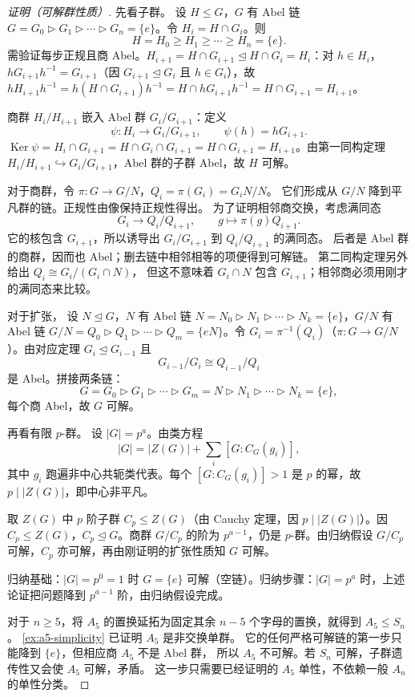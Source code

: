\par\medskip
\begin{proof}[证明（可解群性质）]
先看子群。 设 $H\le G$，$G$ 有 Abel 链 $G=G_0\rhd G_1\rhd\cdots\rhd G_n=\{e\}$。令 $H_i=H\cap G_i$。则
\[
H=H_0\ge H_1\ge\cdots\ge H_n=\{e\}.
\]
需验证每步正规且商 Abel。$H_{i+1}=H\cap G_{i+1}\mathrel{\trianglelefteq} H\cap G_i=H_i$：对 $h\in H_i$，$hG_{i+1}h^{-1}=G_{i+1}$（因 $G_{i+1}\mathrel{\trianglelefteq} G_i$ 且 $h\in G_i$），故 $hH_{i+1}h^{-1}=h(H\cap G_{i+1})h^{-1}=H\cap hG_{i+1}h^{-1}=H\cap G_{i+1}=H_{i+1}$。

商群 $H_i/H_{i+1}$ 嵌入 Abel 群 $G_i/G_{i+1}$：定义
\[
\psi:H_i\to G_i/G_{i+1},\qquad\psi(h)=hG_{i+1}.
\]
$\operatorname{Ker}\psi=H_i\cap G_{i+1}=H\cap G_i\cap G_{i+1}=H\cap G_{i+1}=H_{i+1}$。由第一同构定理 $H_i/H_{i+1}\hookrightarrow G_i/G_{i+1}$，Abel 群的子群 Abel，故 $H$ 可解。

对于商群，令 $\pi:G\to G/N$，$Q_i=\pi(G_i)=G_iN/N$。
它们形成从 $G/N$ 降到平凡群的链。正规性由像保持正规性得出。
为了证明相邻商交换，考虑满同态
\[
G_i\longrightarrow Q_i/Q_{i+1},\qquad g\longmapsto\pi(g)Q_{i+1}.
\]
它的核包含 $G_{i+1}$，所以诱导出 $G_i/G_{i+1}$ 到 $Q_i/Q_{i+1}$ 的满同态。
后者是 Abel 群的商群，因而也 Abel；删去链中相邻相等的项便得到可解链。
第二同构定理另外给出 $Q_i\cong G_i/(G_i\cap N)$，
但这不意味着 $G_i\cap N$ 包含 $G_{i+1}$；相邻商必须用刚才的满同态来比较。

对于扩张， 设 $N\mathrel{\trianglelefteq} G$，$N$ 有 Abel 链 $N=N_0\rhd N_1\rhd\cdots\rhd N_k=\{e\}$，$G/N$ 有 Abel 链 $G/N=Q_0\rhd Q_1\rhd\cdots\rhd Q_m=\{eN\}$。令 $G_i=\pi^{-1}(Q_i)$（$\pi:G\to G/N$）。由对应定理 $G_i\mathrel{\trianglelefteq} G_{i-1}$ 且
\[
G_{i-1}/G_i\cong Q_{i-1}/Q_i
\]
是 Abel。拼接两条链：
\[
G=G_0\rhd G_1\rhd\cdots\rhd G_m=N\rhd N_1\rhd\cdots\rhd N_k=\{e\},
\]
每个商 Abel，故 $G$ 可解。

再看有限 $p$-群。 设 $|G|=p^a$。由类方程
\[
|G|=|Z(G)|+\sum_{i}[G:C_G(g_i)],
\]
其中 $g_i$ 跑遍非中心共轭类代表。每个 $[G:C_G(g_i)]>1$ 是 $p$ 的幂，故 $p\mid|Z(G)|$，即中心非平凡。

取 $Z(G)$ 中 $p$ 阶子群 $C_p\le Z(G)$（由 Cauchy 定理，因 $p\mid|Z(G)|$）。因 $C_p\le Z(G)$，$C_p\mathrel{\trianglelefteq} G$。商群 $G/C_p$ 的阶为 $p^{a-1}$，仍是 $p$-群。由归纳假设 $G/C_p$ 可解，$C_p$ 亦可解，再由刚证明的扩张性质知 $G$ 可解。

归纳基础：$|G|=p^0=1$ 时 $G=\{e\}$ 可解（空链）。归纳步骤：$|G|=p^a$ 时，上述论证把问题降到 $p^{a-1}$ 阶，由归纳假设完成。

对于 $n\ge5$，将 $A_5$ 的置换延拓为固定其余 $n-5$ 个字母的置换，就得到 $A_5\le S_n$。
\cref{ex:a5-simplicity} 已证明 $A_5$ 是非交换单群。
它的任何严格可解链的第一步只能降到 $\{e\}$，但相应商 $A_5$ 不是 Abel 群，
所以 $A_5$ 不可解。若 $S_n$ 可解，子群遗传性又会使 $A_5$ 可解，矛盾。
这一步只需要已经证明的 $A_5$ 单性，不依赖一般 $A_n$ 的单性分类。
\end{proof}\par\medskip

